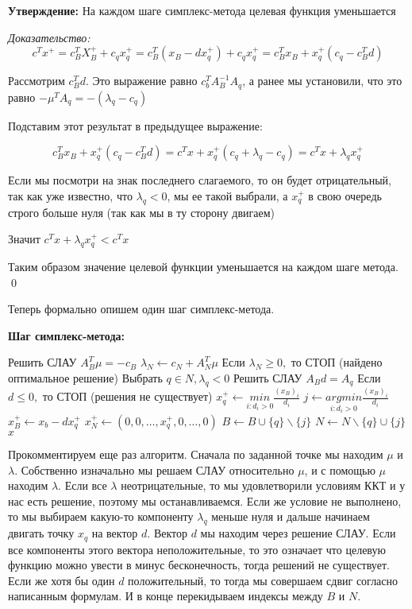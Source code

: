  \textbf{Утверждение:} На каждом шаге симплекс-метода целевая функция уменьшается

 \noindent

 \textit{Доказательство:}
 $$ c^T x^+ = c_B^T X_B^+ + c_q x_q^+ = c_B^T (x_B - d x_q^+) + c_q x_q^+ = c_B^T x_B + x_q^+(c_q - c_B^T d)$$

 Рассмотрим $c_B^T d$. Это выражение равно $c_b^T A_B^{-1} A_q$, а ранее мы установили, что это равно $- \mu^T A_q = - (\lambda_q - c_q)$

 Подставим этот результат в предыдущее выражение:

 $$
 c_B^T x_B + x_q^+(c_q - c_B^T d) = c^T x + x_q^+(c_q + \lambda_q - c_q) = c^T x + \lambda_q x_q^+
 $$

 Если мы посмотри на знак последнего слагаемого, то он будет отрицательный, так как уже известно, что $\lambda_q < 0$, мы ее такой выбрали, а $x_q^+$ в свою очередь строго больше нуля (так как мы в ту сторону двигаем)

 Значит $c^T x + \lambda_q x_q^+ < c^T x$

 Таким образом значение целевой функции уменьшается на каждом шаге метода. \qed

 Теперь формально опишем один шаг симплекс-метода.

\textbf{Шаг симплекс-метода:}
\begin{algorithm}[H]
    \begin{algorithmic}[1]
        \State Решить СЛАУ $A_B^T \mu = - c_B$
        \State $\lambda_N \gets c_N + A_N^T \mu$
        \State Если $\lambda_N \ge 0,$ то СТОП (найдено оптимальное решение)
        \State Выбрать $q\in N, \lambda_q < 0$
        \State Решить СЛАУ $A_B d = A_q$
        \State Если $d \le 0,$ то СТОП (решения не существует)
        \State $x_q^+ \gets \underset{i : d_i > 0}{min} \frac{(x_B)_i}{d_i}$
        \State $j \gets \underset{i : d_i > 0}{argmin} \frac{(x_B)_i}{d_i}$
        \State $x_B^+ \gets x_b - d x_q^+$
        \State $x_N^+ \gets (0, 0, \dots, x_q^+, 0, \dots, 0)$
        \State $B \gets B \cup \{q\} \backslash \{j\}$
        \State $N \gets N \backslash \{q\} \cup \{j\}$
        \State \Return $x$
        \EndProcedure
    \end{algorithmic}
\end{algorithm}

Прокомментируем еще раз алгоритм. Сначала по заданной точке мы находим $\mu$ и $\lambda$. Собственно изначально мы решаем СЛАУ относительно $\mu$, и с помощью $\mu$ находим $\lambda$. Если все $\lambda$ неотрицательные, то мы удовлетворили условиям ККТ и у нас есть решение, поэтому мы останавливаемся. Если же условие не выполнено, то мы выбираем какую-то компоненту $\lambda_q$ меньше нуля и дальше начинаем двигать точку $x_q$ на вектор $d$. Вектор $d$ мы находим через решение СЛАУ. Если все компоненты этого вектора неположительные, то это означает что целевую функцию можно увести в минус бесконечность, тогда решений не существует. Если же хотя бы один $d$ положительный, то тогда мы совершаем сдвиг согласно написанным формулам.
И в конце перекидываем индексы между $B$ и $N$.

